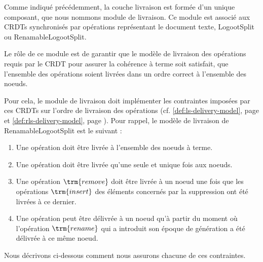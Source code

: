 \label{sec:mute-delivery-model}

Comme indiqué précédemment, la couche livraison est formée d'un unique composant, que nous nommons module de livraison.
Ce module est associé aux \acp{CRDT} synchronisés par opérations représentant le document texte, \ie LogootSplit ou RenamableLogootSplit.

Le rôle de ce module est de garantir que le modèle de livraison des opérations requis par le \ac{CRDT} pour assurer la cohérence à terme  soit satisfait, \ie que l'ensemble des opérations soient livrées dans un ordre correct à l'ensemble des noeuds.

Pour cela, le module de livraison doit implémenter les contraintes imposées par ces \acp{CRDT} sur l'ordre de livraison des opérations (cf. \autoref{def:ls-delivery-model}, page \pageref{def:ls-delivery-model} et \autoref{def:rls-delivery-model}, page \pageref{def:ls-delivery-model}).
Pour rappel, le modèle de livraison de RenamableLogootSplit est le suivant :
\begin{enumerate}
    \item Une opération doit être livrée à l'ensemble des noeuds à terme.
    \item Une opération doit être livrée qu'une seule et unique fois aux noeuds.
    \item Une opération $\trm{remove}$ doit être livrée à un noeud une fois que les opérations $\trm{insert}$ des éléments concernés par la suppression ont été livrées à ce dernier.
    \item Une opération peut être délivrée à un noeud qu'à partir du moment où l'opération $\trm{rename}$ qui a introduit son époque de génération a été délivrée à ce même noeud.
\end{enumerate}

Nous décrivons ci-dessous comment nous assurons chacune de ces contraintes.
